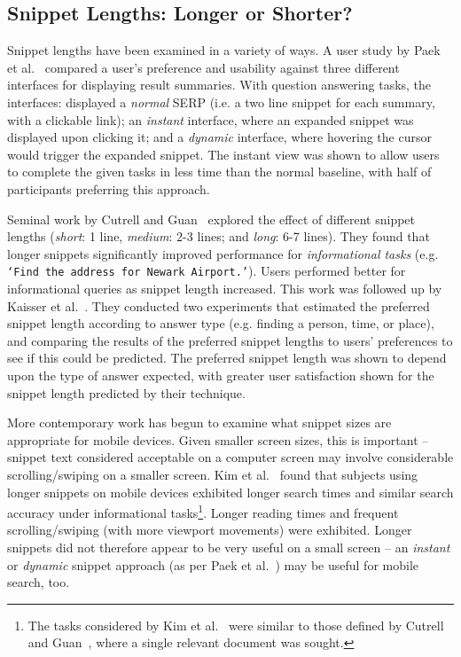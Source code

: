 \subsection{Snippet Lengths: Longer or Shorter?}
Snippet lengths have been examined in a variety of ways. A user study by Paek et al.~\cite{paek2004wavelens} compared a user's preference and usability against three different interfaces for displaying result summaries. With question answering tasks, the interfaces: displayed a \emph{normal} SERP (i.e. a two line snippet for each summary, with a clickable link); an \emph{instant} interface, where an expanded snippet was displayed upon clicking it; and a \emph{dynamic} interface, where hovering the cursor would trigger the expanded snippet. The instant view was shown to allow users to complete the given tasks in less time than the normal baseline, with half of participants preferring this approach.

Seminal work by Cutrell and Guan~\cite{cutrell2007result_page} explored the effect of different snippet lengths (\emph{short}: 1 line, \emph{medium}: 2-3 lines; and \emph{long}: 6-7 lines). They found that longer snippets significantly improved performance for \textit{informational tasks} (e.g. \texttt{`Find the address for Newark Airport.'}). Users performed better for informational queries as snippet length increased. This work was followed up by Kaisser et al.~\cite{kaisser2008improving}. They conducted two experiments that estimated the preferred snippet length according to answer type (e.g. finding a person, time, or place), and comparing the results of the preferred snippet lengths to users' preferences to see if this could be predicted. The preferred snippet length was shown to depend upon the type of answer expected, with greater user satisfaction shown for the snippet length predicted by their technique.%

More contemporary work has begun to examine what snippet sizes are appropriate for mobile devices. Given smaller screen sizes, this is important -- snippet text considered acceptable on a computer screen may involve considerable scrolling/swiping on a smaller screen. Kim et al.~\cite{kim2017mobile_search_snippets} found that subjects using longer snippets on mobile devices exhibited longer search times and similar search accuracy under informational tasks\footnote{The tasks considered by Kim et al.~\cite{kim2017mobile_search_snippets} were similar to those defined by Cutrell and Guan~\cite{cutrell2007result_page}, where a single relevant document was sought.}. Longer reading times and frequent scrolling/swiping (with more viewport movements) were exhibited. Longer snippets did not therefore appear to be very useful on a small screen -- an \emph{instant} or \emph{dynamic} snippet approach (as per Paek et al.~\cite{paek2004wavelens}) may be useful for mobile search, too.

